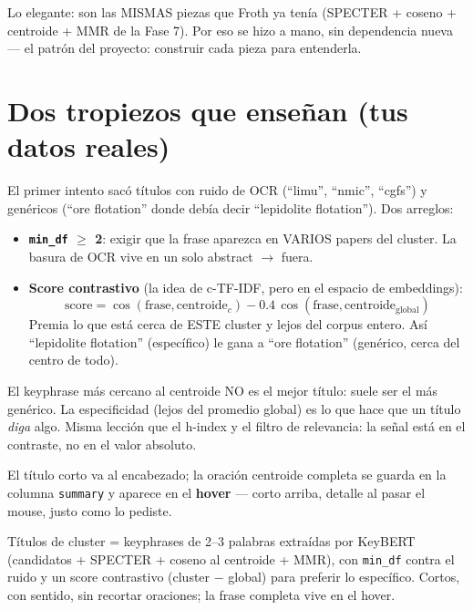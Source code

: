 \documentclass[11pt,a4paper]{article}
\begin{document}
Lo elegante: son las MISMAS piezas que Froth ya tenía (SPECTER + coseno + centroide +
MMR de la Fase 7). Por eso se hizo a mano, sin dependencia nueva --- el patrón del
proyecto: construir cada pieza para entenderla.

\section{Dos tropiezos que enseñan (tus datos reales)}

El primer intento sacó títulos con ruido de OCR (``limu'', ``nmic'', ``cgfs'') y
genéricos (``ore flotation'' donde debía decir ``lepidolite flotation''). Dos arreglos:

\begin{itemize}
  \item \textbf{\texttt{min\_df} $\geq$ 2}: exigir que la frase aparezca en VARIOS papers
        del cluster. La basura de OCR vive en un solo abstract $\to$ fuera.
  \item \textbf{Score contrastivo} (la idea de c-TF-IDF, pero en el espacio de
        embeddings):
        \[
        \mathrm{score} = \cos(\mathrm{frase}, \mathrm{centroide}_c)
                       - 0.4 \, \cos(\mathrm{frase}, \mathrm{centroide}_{\mathrm{global}})
        \]
        Premia lo que está cerca de ESTE cluster y lejos del corpus entero. Así
        ``lepidolite flotation'' (específico) le gana a ``ore flotation'' (genérico,
        cerca del centro de todo).
\end{itemize}

\begin{ojo}
El keyphrase más cercano al centroide NO es el mejor título: suele ser el más genérico.
La especificidad (lejos del promedio global) es lo que hace que un título \emph{diga}
algo. Misma lección que el h-index y el filtro de relevancia: la señal está en el
contraste, no en el valor absoluto.
\end{ojo}

\begin{practica}
El título corto va al encabezado; la oración centroide completa se guarda en la columna
\texttt{summary} y aparece en el \textbf{hover} --- corto arriba, detalle al pasar el
mouse, justo como lo pediste.
\end{practica}

\begin{resumen}
Títulos de cluster = keyphrases de 2--3 palabras extraídas por KeyBERT (candidatos +
SPECTER + coseno al centroide + MMR), con \texttt{min\_df} contra el ruido y un score
contrastivo (cluster $-$ global) para preferir lo específico. Cortos, con sentido, sin
recortar oraciones; la frase completa vive en el hover.
\end{resumen}
\clearpage
{}
{}
\end{document}

